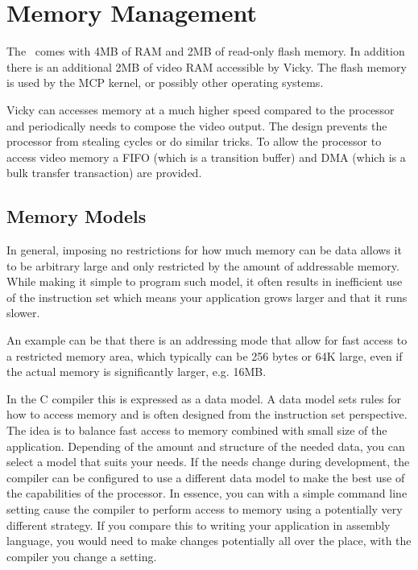 \chapter{Memory Management}

The \foenix\ comes with 4MB of RAM and 2MB of read-only flash
memory. In addition there is an additional 2MB of video RAM accessible by
Vicky.
The flash memory is used by the MCP kernel, or possibly other
operating systems.

Vicky can accesses memory at a much higher speed compared to the
processor and periodically needs to compose the video output. The
design prevents the processor from stealing cycles or do similar
tricks. To allow the processor to access video memory a FIFO (which is
a transition buffer) and DMA (which is a bulk transfer transaction)
are provided.

\section*{Memory Models}

In general, imposing no restrictions for how much memory can be data
allows it to be arbitrary large and only restricted by the amount of
addressable memory. While making it simple to program such model, it
often results in inefficient use of the instruction set which means
your application grows larger and that it runs slower.

An example can be that there is an addressing mode that allow for fast
access to a restricted memory area, which typically can be 256 bytes
or 64K large, even if the actual memory is significantly larger,
e.g. 16MB.

In the C compiler this is expressed as a data model. A data model sets
rules for how to access memory and is often designed from the
instruction set perspective. The idea is to balance fast access to
memory combined with small size of the application. Depending of the
amount and structure of the needed data, you can select a model that
suits your needs. If the needs change during development, the compiler
can be configured to use a different data model to make the best use
of the capabilities of the processor. In essence, you can with a
simple command line setting cause the compiler to perform access to
memory using a potentially very different strategy. If you compare
this to writing your application in assembly language, you would need
to make changes potentially all over the place, with the compiler you
change a setting.

